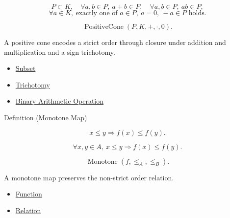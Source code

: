 \begin{remark*}
\[
P\subset K,\quad
\forall a,b\in P,\ a+b\in P,\quad
\forall a,b\in P,\ ab\in P,
\]
\[
\forall a\in K,\ \text{exactly one of }a\in P,\ a=0,\ -a\in P\text{ holds}.
\]
\end{remark*}

\begin{remark*}
\[
\operatorname{PositiveCone}(P,K,+,\cdot,0).
\]
\end{remark*}

\begin{remark*}[Interpretation]
A positive cone encodes a strict order through closure under addition and
multiplication and a sign trichotomy.
\end{remark*}

\begin{dependencies}
\begin{itemize}
  \item \hyperref[def:subset]{Subset}
  \item \hyperref[def:trichotomy]{Trichotomy}
  \item \hyperref[def:binary-arithmetic-operation]{Binary Arithmetic Operation}
\end{itemize}
\end{dependencies}

\begin{definitionbox}{Definition (Monotone Map)}
\begin{definition}
\label{def:monotone-map}
\[
x\le y \Longrightarrow f(x)\le f(y).
\]
\end{definition}
\end{definitionbox}

\begin{remark*}
\[
\forall x,y\in A,\ x\le y \Longrightarrow f(x)\le f(y).
\]
\end{remark*}

\begin{remark*}
\[
\operatorname{Monotone}(f,\le_A,\le_B).
\]
\end{remark*}

\begin{remark*}[Interpretation]
A monotone map preserves the non-strict order relation.
\end{remark*}

\begin{dependencies}
\begin{itemize}
  \item \hyperref[def:function]{Function}
  \item \hyperref[def:relation]{Relation}
\end{itemize}
\end{dependencies}

